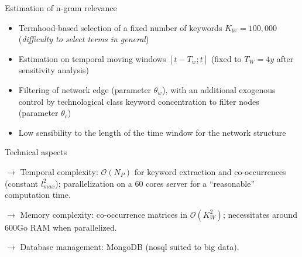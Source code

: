 \documentclass{beamer}
\begin{document}
\begin{frame}{Estimation of n-gram relevance}\label{slide:relevance}
    
    \begin{itemize}
        \item Termhood-based selection of a fixed number of keywords $K_W = 100,000$ (\textit{difficulty to select terms in general}) \hyperlink{slide:filtration}{}
        \item Estimation on temporal moving windows $\left[t - T_w ; t\right]$ (fixed to $T_W = 4y$ after sensitivity analysis)
        \item Filtering of network edge (parameter $\theta_w$), with an additional exogenous control by technological class keyword concentration to filter nodes (parameter $\theta_c$)
        \item Low sensibility to the length of the time window for the network structure  
\hyperlink{slide:sensitivity}{}
    \end{itemize}
    
\end{frame}


\begin{frame}{Technical aspects}
	
	$\rightarrow$ Temporal complexity: $\mathcal{O}(N_P)$ for keyword extraction and co-occurrences (constant $l_{max}^2$); parallelization on a 60 cores server for a ``reasonable'' computation time. 
	
	\bigskip
	
	$\rightarrow$ Memory complexity: co-occurrence matrices in $\mathcal{O}(K_W^2)$; necessitates around 600Go RAM when parallelized. 
	
	\bigskip

	$\rightarrow$ Database management: MongoDB (nosql suited to big data).	
	
	
	
	
\end{frame}
\end{document}
